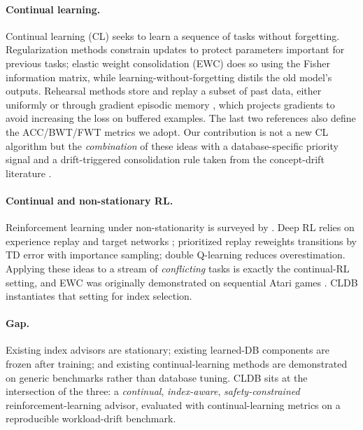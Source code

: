\paragraph{Continual learning.}
Continual learning (CL) seeks to learn a sequence of tasks without forgetting.
Regularization methods constrain updates to protect parameters important for
previous tasks; elastic weight consolidation (EWC) \citep{kirkpatrick2017ewc}
does so using the Fisher information matrix, while learning-without-forgetting
\citep{li2017lwf} distils the old model's outputs. Rehearsal methods store and
replay a subset of past data, either uniformly \citep{rolnick2019replay} or
through gradient episodic memory \citep{lopezpaz2017gem}, which projects
gradients to avoid increasing the loss on buffered examples. The last two
references also define the ACC/BWT/FWT metrics we adopt. Our contribution is not
a new CL algorithm but the \emph{combination} of these ideas with a
database-specific priority signal and a drift-triggered consolidation rule taken
from the concept-drift literature \citep{gama2014drift}.

\paragraph{Continual and non-stationary RL.}
Reinforcement learning under non-stationarity is surveyed by
\citet{khetarpal2022continual}. Deep RL relies on experience replay and target
networks \citep{mnih2015dqn,lillicrap2016ddpg}; prioritized replay
\citep{schaul2016prioritized} reweights transitions by TD error with importance
sampling; double Q-learning \citep{vanhasselt2016double} reduces overestimation.
Applying these ideas to a stream of \emph{conflicting} tasks is exactly the
continual-RL setting, and EWC was originally demonstrated on sequential Atari
games \citep{kirkpatrick2017ewc}. CLDB instantiates that setting for index
selection.

\paragraph{Gap.}
Existing index advisors are stationary; existing learned-DB components are frozen
after training; and existing continual-learning methods are demonstrated on
generic benchmarks rather than database tuning. CLDB sits at the intersection of
the three: a \emph{continual}, \emph{index-aware}, \emph{safety-constrained}
reinforcement-learning advisor, evaluated with continual-learning metrics on a
reproducible workload-drift benchmark.
